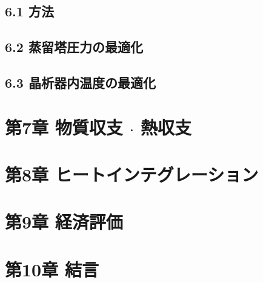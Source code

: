 \documentclass[a4j]{jsarticle}
\begin{document}
\section*{6.1 方法}
\section*{6.2 蒸留塔圧力の最適化}
\section*{6.3 晶析器内温度の最適化}

\chapter*{第7章 物質収支 $\cdot$ 熱収支}

\chapter*{第8章 ヒートインテグレーション}

\chapter*{第9章 経済評価}

\chapter*{第10章 結言}
\end{document}

